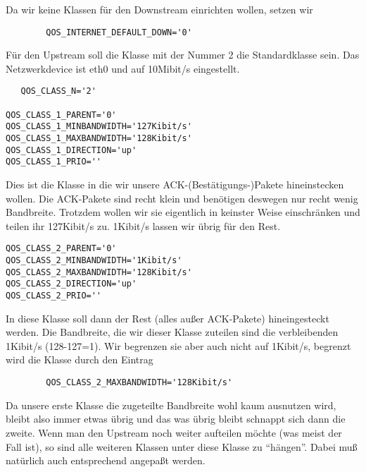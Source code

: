    Da wir keine Klassen für den Downstream einrichten wollen, setzen wir
\begin{example}
\begin{verbatim}
        QOS_INTERNET_DEFAULT_DOWN='0'
\end{verbatim}
\end{example}

   Für den Upstream soll die Klasse mit der Nummer 2 die
   Standardklasse sein. Das Netzwerkdevice ist eth0 und auf 10Mibit/s
   eingestellt.

\begin{small}
\begin{example}
\begin{verbatim}
   QOS_CLASS_N='2'

QOS_CLASS_1_PARENT='0'
QOS_CLASS_1_MINBANDWIDTH='127Kibit/s'
QOS_CLASS_1_MAXBANDWIDTH='128Kibit/s'
QOS_CLASS_1_DIRECTION='up'
QOS_CLASS_1_PRIO=''

\end{verbatim}
\end{example}
\end{small}
   Dies ist die Klasse in die wir unsere ACK-(Bestätigungs-)Pakete
   hineinstecken wollen. Die ACK-Pakete sind recht klein und benötigen
   deswegen nur recht wenig Bandbreite. Trotzdem wollen wir sie
   eigentlich in keinster Weise einschränken und teilen ihr 127Kibit/s zu.
   1Kibit/s lassen wir übrig für den Rest.

\begin{small}
\begin{example}
\begin{verbatim}
QOS_CLASS_2_PARENT='0'
QOS_CLASS_2_MINBANDWIDTH='1Kibit/s'
QOS_CLASS_2_MAXBANDWIDTH='128Kibit/s'
QOS_CLASS_2_DIRECTION='up'
QOS_CLASS_2_PRIO=''
\end{verbatim}
\end{example}
\end{small}

   In diese Klasse soll dann der Rest (alles außer ACK-Pakete)
   hineingesteckt werden. Die Bandbreite, die wir dieser Klasse zuteilen
   sind die verbleibenden 1Kibit/s (128-127=1). Wir begrenzen sie aber auch
   nicht auf 1Kibit/s, begrenzt wird die Klasse durch den Eintrag
\begin{example}
\begin{verbatim}
        QOS_CLASS_2_MAXBANDWIDTH='128Kibit/s'
\end{verbatim}
\end{example}

   Da unsere erste Klasse die zugeteilte Bandbreite wohl kaum
   ausnutzen wird, bleibt also immer etwas übrig und das was übrig
   bleibt schnappt sich dann die zweite.  Wenn man den Upstream noch
   weiter aufteilen möchte (was meist der Fall ist), so sind alle
   weiteren Klassen unter diese Klasse zu ``hängen''.  Dabei muß
   natürlich auch  entsprechend angepaßt
   werden.

